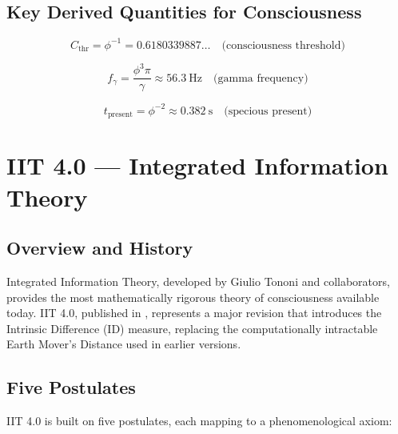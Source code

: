 \documentclass[12pt,a4paper]{article}
\begin{document}
\subsection{Key Derived Quantities for Consciousness}

\begin{equation}
C_{\mathrm{thr}} = \phi^{-1} = 0.6180339887\ldots \quad \text{(consciousness threshold)}
\label{eq:threshold}
\end{equation}

\begin{equation}
f_\gamma = \frac{\phi^3 \pi}{\gamma} \approx 56.3~\text{Hz} \quad \text{(gamma frequency)}
\label{eq:fgamma}
\end{equation}

\begin{equation}
t_{\mathrm{present}} = \phi^{-2} \approx 0.382~\text{s} \quad \text{(specious present)}
\label{eq:specious}
\end{equation}

\section{IIT 4.0 --- Integrated Information Theory}
\label{sec:iit}

\subsection{Overview and History}

Integrated Information Theory, developed by Giulio Tononi and collaborators,
provides the most mathematically rigorous theory of consciousness available
today. IIT 4.0, published in \cite{Albantakis2023}, represents a major revision
that introduces the Intrinsic Difference (ID) measure, replacing the
computationally intractable Earth Mover's Distance used in earlier versions.

\subsection{Five Postulates}

IIT 4.0 is built on five postulates, each mapping to a phenomenological axiom:
\end{document}
